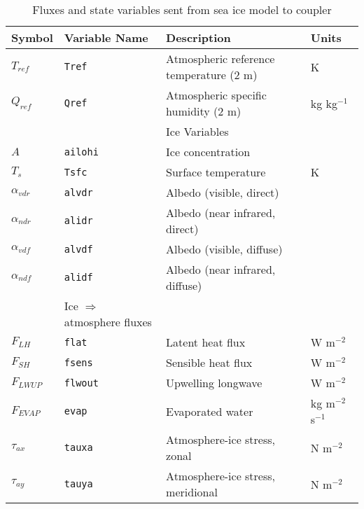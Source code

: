 \begin{table}
  \begin{center}
  \caption{Fluxes and state variables sent from sea ice model to coupler}
  \label{table:flux_to_coupler}
  \begin{tabular}{llll} \hline
         Symbol         & Variable Name     & Description                 & Units        \\ \hline \hline
         $T_{ref}$      & {\tt Tref}   &  Atmospheric reference temperature (2 m) &  K  \\
         $Q_{ref}$      & {\tt Qref}   &  Atmospheric specific humidity (2 m)     &  kg kg$^{-1}$ \\ \hline
                        &           & Ice Variables                             &  \\  \hline
         $A$            & {\tt ailohi} &  Ice concentration                     &      \\
         $T_s$          & {\tt Tsfc}   &  Surface temperature                   &  K    \\
         $\alpha_{vdr}$ & {\tt alvdr}  &  Albedo (visible, direct)              &       \\
         $\alpha_{ndr}$ & {\tt alidr}  &  Albedo (near infrared, direct)        &       \\
         $\alpha_{vdf}$ & {\tt alvdf}  &  Albedo (visible, diffuse)             &       \\
         $\alpha_{ndf}$ & {\tt alidf}  &  Albedo (near infrared, diffuse)       &       \\  \hline
                        & Ice $\Rightarrow$ atmosphere fluxes           &  \\  \hline
         $F_{LH}$       & {\tt flat}   &  Latent heat flux                      &  W m$^{-2}$    \\
         $F_{SH}$       & {\tt fsens}  &  Sensible heat flux                    &  W m$^{-2}$    \\
         $F_{LWUP}$     & {\tt flwout} &  Upwelling longwave                    &  W m$^{-2}$    \\
         $F_{EVAP}$     & {\tt evap}   &  Evaporated water                      &  kg m$^{-2}$ s$^{-1}$    \\
         $\tau_{ax}$    & {\tt tauxa}  &  Atmosphere-ice stress, zonal          &  N m$^{-2}$    \\
         $\tau_{ay}$    & {\tt tauya}  &  Atmosphere-ice stress, meridional     &  N m$^{-2}$    \\  \hline

\end{tabular}
\end{center}
\end{table}
